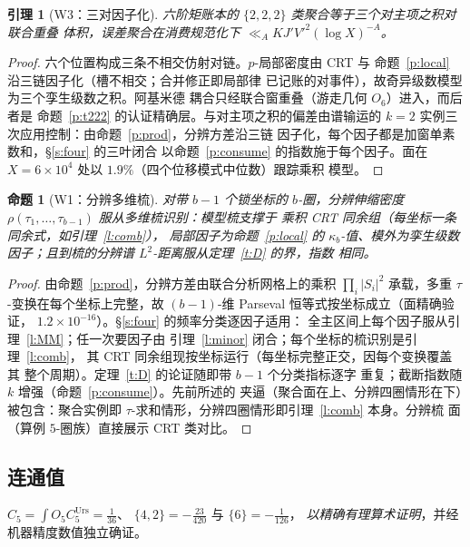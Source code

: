 \documentclass[11pt]{article}
\numberwithin{equation}{section}
\newtheorem{lemma}[theorem]{引理}
\newtheorem{proposition}[theorem]{命题}
\theoremstyle{definition}
\theoremstyle{remark}
\begin{document}
\begin{lemma}[W3：三对因子化]\label{l:W3}
六阶矩账本的 $\{2,2,2\}$ 类聚合等于三个对主项之积对联合重叠
体积，误差聚合在消费规范化下 $\ll_A KJ'V'^2(\log X)^{-A}$。
\end{lemma}

\begin{proof}
六个位置构成三条不相交仿射对链。$p$-局部密度由 CRT 与
命题~\ref{p:local} 沿三链因子化（槽不相交；合并修正即局部律
已记账的对事件），故奇异级数模型为三个孪生级数之积。阿基米德
耦合只经联合窗重叠（游走几何 $O_6$）进入，而后者是
命题~\ref{p:t222} 的认证精确层。与对主项之积的偏差由谱输运的
$k=2$ 实例三次应用控制：由命题~\ref{p:prod}，分辨方差沿三链
因子化，每个因子都是加窗单素数和，\S\ref{s:four} 的三叶闭合
以命题~\ref{p:consume} 的指数施于每个因子。面在
$X=6\times10^{4}$ 处以 $1.9\%$（四个位移模式中位数）跟踪乘积
模型。
\end{proof}

\begin{proposition}[W1：分辨多维梳]\label{p:W1}
对带 $b-1$ 个锁坐标的 $b$-圈，分辨伸缩密度
$\rho(\tau_1,\dots,\tau_{b-1})$ 服从多维梳识别：模型梳支撑于
乘积 CRT 同余组（每坐标一条同余式，如引理~\ref{l:comb}），
局部因子为命题~\ref{p:local} 的 $\kappa_b$-值、模外为孪生级数
因子；且到梳的分辨谱 $L^2$-距离服从定理~\ref{t:D} 的界，指数
相同。
\end{proposition}

\begin{proof}
由命题~\ref{p:prod}，分辨方差由联合分析网格上的乘积
$\prod_i|S_i|^2$ 承载，多重 $\tau$-变换在每个坐标上完整，故
$(b-1)$-维 Parseval 恒等式按坐标成立（面精确验证，
$1.2\times10^{-16}$）。\S\ref{s:four} 的频率分类逐因子适用：
全主区间上每个因子服从引理~\ref{l:MM}；任一次要因子由
引理~\ref{l:minor} 闭合；每个坐标的梳识别是引理~\ref{l:comb}，
其 CRT 同余组现按坐标运行（每坐标完整正交，因每个变换覆盖其
整个周期）。定理~\ref{t:D} 的论证随即带 $b-1$ 个分类指标逐字
重复；截断指数随 $k$ 增强（命题~\ref{p:consume}）。先前所述的
夹逼（聚合面在上、分辨四圈情形在下）被包含：聚合实例即
$\tau$-求和情形，分辨四圈情形即引理~\ref{l:comb} 本身。分辨梳
面（算例 $5$-圈族）直接展示 CRT 类对比。
\end{proof}

\subsection{连通值}\label{s:five:conn}

$C_5=\int O_5C_5^{\mathrm{Urs}}=\tfrac1{36}$、
$\{4,2\}=-\tfrac{23}{420}$ 与 $\{6\}=-\tfrac1{126}$，
\emph{以精确有理算术证明}，并经机器精度数值独立确证。
\end{document}
